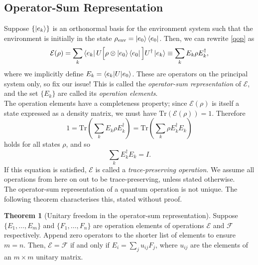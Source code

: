 \documentclass[12pt,a4paper]{report}
\numberwithin{equation}{section}
\newcommand{\ketbra}[2]{\ket{#1}\bra{#2}}
\newcommand{\ketbras}[1]{\ketbra{#1}{#1}}
\theoremstyle{definition}
\theoremstyle{theorem}
\newtheorem{theorem}{Theorem}[section]
\theoremstyle{theorem}
\theoremstyle{example}
\theoremstyle{definition}
\begin{document}
\subsection{Operator-Sum Representation}
Suppose $\{\ket{e_{k}}\}$ is an orthonormal basis for the environment system such that the environment is initially in the state $\rho_{\text{env}}=\ketbras{e_{0}}$. Then, we can rewrite \ref{qop} as
\begin{equation}\label{opel}
	\mathcal{E}(\rho)=\sum_{k}\bra{e_{k}}U\Big[\rho\otimes\ketbras{e_{0}}\Big]U^{\dagger}\ket{e_{k}}\equiv\sum_{k}E_{k}\rho E_{k}^{\dagger},
\end{equation}
where we implicitly define $E_{k}=\braket{e_{k}|U|e_{0}}$. These are operators on the principal system only, so fix our issue! This is called the \textit{operator-sum representation} of $\mathcal{E}$, and the set $\{E_{k}\}$ are called its \textit{operation elements}.\\
The operation elements have a completeness property; since $\mathcal{E}(\rho)$ is itself a state expressed as a density matrix, we must have $\text{Tr}(\mathcal{E}(\rho))=1$. Therefore
\begin{equation}
	1=\text{Tr}\left(\sum_{k}E_{k}\rho E_{k}^{\dagger}\right)=\text{Tr}\left(\sum_{k}\rho E_{k}^{\dagger}E_{k}\right)
\end{equation}
holds for all states $\rho$, and so
\begin{equation}
	\sum_{k}E_{k}^{\dagger}E_{k}=I.
\end{equation}
If this equation is satisfied, $\mathcal{E}$ is called a \textit{trace-preserving operation}. We assume all operations from here on out to be trace-preserving, unless stated otherwise.\\
The operator-sum representation of a quantum operation is not unique. The following theorem characterises this, stated without proof.
\begin{theorem}[Unitary freedom in the operator-sum representation]
	Suppose $\{E_{1},\ldots,E_{m}\}$ and $\{F_{1},\ldots,F_{n}\}$ are operation elements of operations $\mathcal{E}$ and $\mathcal{F}$ respectively. Append zero operators to the shorter list of elements to ensure $m=n$. Then, $\mathcal{E}=\mathcal{F}$ if and only if $E_{i}=\sum_{j}u_{ij}F_{j}$, where $u_{ij}$ are the elements of an $m\times m$ unitary matrix.
\end{theorem}
\end{document}
